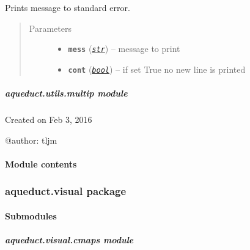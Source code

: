 \documentclass[a4paper,10pt,english]{sphinxmanual}
\begin{document}
\begin{fulllineitems}
\label{aqueduct.utils.log:aqueduct.utils.log.message}
Prints message to standard error.
\begin{quote}\begin{description}
\item[{Parameters}] \leavevmode\begin{itemize}
\item {} 
\textbf{\texttt{mess}} (\href{http://docs.python.org/2/library/functions.html\#str}{\emph{\texttt{str}}}) -- message to print

\item {} 
\textbf{\texttt{cont}} (\href{http://docs.python.org/2/library/functions.html\#bool}{\emph{\texttt{bool}}}) -- if set True no new line is printed

\end{itemize}

\end{description}\end{quote}

\end{fulllineitems}



\subparagraph{aqueduct.utils.multip module}
\label{aqueduct.utils.multip:module-aqueduct.utils.multip}\label{aqueduct.utils.multip::doc}\label{aqueduct.utils.multip:aqueduct-utils-multip-module}
Created on Feb 3, 2016

@author: tljm


\paragraph{Module contents}
\label{aqueduct.utils:module-aqueduct.utils}\label{aqueduct.utils:module-contents}

\subsubsection{aqueduct.visual package}
\label{aqueduct.visual:aqueduct-visual-package}\label{aqueduct.visual::doc}

\paragraph{Submodules}
\label{aqueduct.visual:submodules}

\subparagraph{aqueduct.visual.cmaps module}
\label{aqueduct.visual.cmaps:module-aqueduct.visual.cmaps}\label{aqueduct.visual.cmaps::doc}\label{aqueduct.visual.cmaps:aqueduct-visual-cmaps-module}
\end{document}
